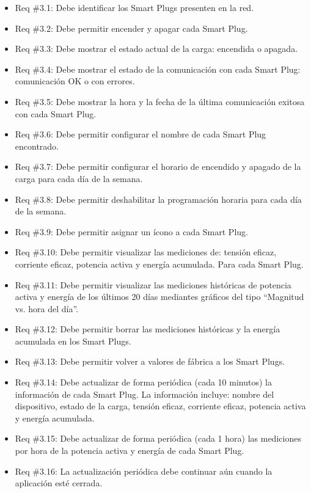 \begin{itemize}
\begin{itemize}
\item Req \#3.1: Debe identificar los Smart Plugs presenten en la red.
\item Req \#3.2: Debe permitir encender y apagar cada Smart Plug.
\item Req \#3.3: Debe mostrar el estado actual de la carga: encendida o apagada.
\item Req \#3.4: Debe mostrar el estado de la comunicación con cada Smart Plug: comunicación OK o con errores.
\item Req \#3.5: Debe mostrar la hora y la fecha de la última comunicación exitosa con cada Smart Plug. 
\item Req \#3.6: Debe permitir configurar el nombre de cada Smart Plug encontrado.
\item Req \#3.7: Debe permitir configurar el horario de encendido y apagado de la carga para cada día de la semana.
\item Req \#3.8: Debe permitir deshabilitar la programación horaria para cada día de la semana.
\item Req \#3.9: Debe permitir asignar un ícono a cada Smart Plug.
\item Req \#3.10: Debe permitir visualizar las mediciones de: tensión eficaz, corriente eficaz, potencia activa y energía acumulada. Para cada Smart Plug.
\item Req \#3.11: Debe permitir visualizar las mediciones históricas de potencia activa y energía de los últimos 20 días mediantes gráficos del tipo “Magnitud vs. hora del día”.
\item Req \#3.12: Debe permitir borrar las mediciones históricas y la energía acumulada en los Smart Plugs.
\item Req \#3.13: Debe permitir volver a valores de fábrica a los Smart Plugs.
\item Req \#3.14: Debe actualizar de forma periódica (cada 10 minutos) la información de cada Smart Plug. La información incluye: nombre del dispositivo, estado de la carga, tensión eficaz, corriente eficaz, potencia activa y energía acumulada.
\item Req \#3.15: Debe actualizar de forma periódica (cada 1 hora) las mediciones por hora de la potencia activa y energía de cada Smart Plug.
\item Req \#3.16: La actualización periódica debe continuar aún cuando la aplicación esté cerrada.
\end{itemize}

\end{itemize}



